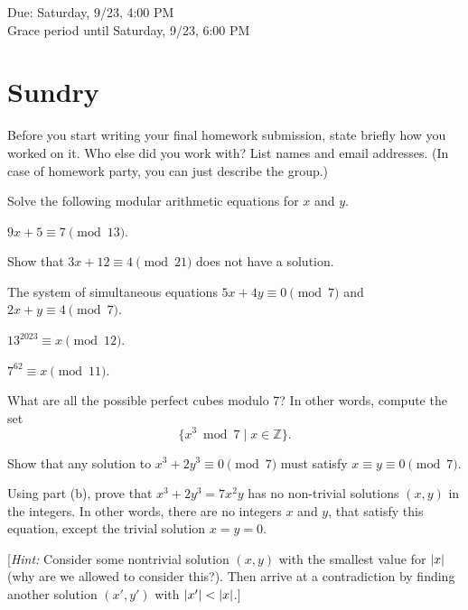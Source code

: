 \documentclass[11pt]{article}
\begin{document}
\maketitle
\fontsize{12}{15}\selectfont

\begin{center}
    Due: Saturday, 9/23, 4:00 PM \\
    Grace period until Saturday, 9/23, 6:00 PM \\
\end{center}

\section*{Sundry}
Before you start writing your final homework submission, state briefly how you worked on it.  Who else did you work with?  List names and email addresses.  (In case of homework party, you can just describe the group.)

\vspace{15pt}


Solve the following modular arithmetic equations for $x$ and $y$.
\begin{Parts}
\Part $9x+5 \equiv 7 \pmod{13}$.

\Part Show that $3x+12 \equiv 4 \pmod{21}$ does not have a solution.

\Part The system of simultaneous equations
$5x+4y \equiv 0 \pmod{7}$ and $2x+y \equiv 4 \pmod{7}$.

\Part $13^{2023} \equiv x \pmod{12}$.

\Part $7^{62} \equiv x \pmod{11}$.

\end{Parts}


\begin{Parts}
    \Part What are all the possible perfect cubes modulo 7? In other words, compute the set
    \[
        \{x^3 \bmod{7} \mid x \in \mathbb{Z}\}
    .\]

    \Part Show that any solution to $x^3 + 2y^3 \equiv 0 \pmod{7}$ must satisfy $x \equiv y \equiv 0 \pmod{7}$.

    \Part Using part (b), prove that $x^3 + 2y^3 = 7x^2 y$ has no non-trivial solutions $(x, y)$ in the integers. In other words, there are no integers $x$ and $y$, that satisfy this equation, except the trivial solution $x=y=0$.

    [\emph{Hint:} Consider some nontrivial solution $(x, y)$ with the smallest value for $\left\lvert x \right\rvert$ (why are we allowed to consider this?). Then arrive at a contradiction by finding another solution $(x', y')$ with $\left\lvert x' \right\rvert < \left\lvert x \right\rvert$.]

\end{Parts}
\end{document}
